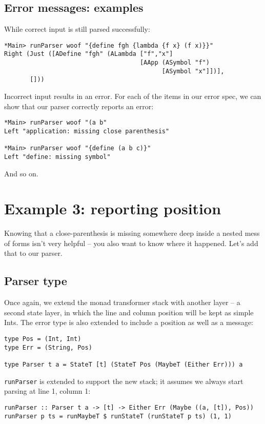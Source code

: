\documentclass{tmr}
\begin{document}
\subsection{Error messages:  examples}
While correct input is still parsed successfully:
\begin{verbatim}
*Main> runParser woof "{define fgh {lambda {f x} (f x)}}"
Right (Just ([ADefine "fgh" (ALambda ["f","x"] 
                                     [AApp (ASymbol "f") 
                                           [ASymbol "x"]])],
       []))
\end{verbatim}

Incorrect input results in an error.  For each of the items in our error spec, 
we can show that our parser correctly reports an error: 
\begin{verbatim}
*Main> runParser woof "(a b"
Left "application: missing close parenthesis"

*Main> runParser woof "{define (a b c)}"
Left "define: missing symbol"
\end{verbatim}

And so on.




\section{Example 3: reporting position}

Knowing that a close-parenthesis is missing somewhere deep inside a nested mess
of forms isn't very helpful -- you also want to know where it happened.  Let's 
add that to our parser.


\subsection{Parser type}

Once again, we extend the monad transformer stack with another layer -- a second
state layer, in which the line and column position will be kept as simple Ints.
The error type is also extended to include a position as well as a message:
\begin{verbatim}
type Pos = (Int, Int)
type Err = (String, Pos)

type Parser t a = StateT [t] (StateT Pos (MaybeT (Either Err))) a 
\end{verbatim}

\verb+runParser+ is extended to support the new stack; it assumes we always
start parsing at line 1, column 1:
\begin{verbatim}
runParser :: Parser t a -> [t] -> Either Err (Maybe ((a, [t]), Pos))
runParser p ts = runMaybeT $ runStateT (runStateT p ts) (1, 1)
\end{verbatim}
\end{document}
